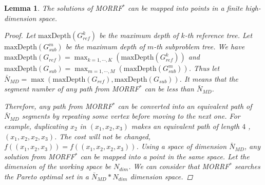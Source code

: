 \documentclass[conference]{IEEEtran}
\newtheorem{lem}{Lemma}
\begin{document}
\begin{lem}
\label{lem:moo-d:rrt}
The solutions of MORRF$^{*}$ can be mapped into points in a finite high-dimension space.
\begin{proof}
Let $ \mbox{maxDepth}(G_{ref}^{k}) $ be the maximum depth of $ k $-th reference tree.
Let $ \mbox{maxDepth}(G_{sub}^{m}) $ be the maximum depth of $ m $-th subproblem tree.
We have $ \mbox{maxDepth}(G_{ref}) = \max_{k = 1 , \cdots , K} ( \mbox{maxDepth}(G_{ref}^{k}) ) $ and $ \mbox{maxDepth}(G_{sub}) = \max_{m = 1 , \cdots , M} ( \mbox{maxDepth}(G_{sub}^{m}) ) $.
Thus let 
 $ \bar{N}_{MD} = \max \left(  \mbox{maxDepth}(G_{ref}), \mbox{maxDepth}(G_{sub}) \right) $.
It means that the segment number of any path from MORRF$^{*}$ can be less than $ \bar{N}_{MD} $.

Therefore, any path from MORRF$^{*}$ can be converted into an equivalent path of $ \bar{N}_{MD} $ segments by repeating some vertex before moving to the next one.
For example, duplicating $ x_{2} $ in $ (x_{1} , x_{2}, x_{3} ) $ makes an equivalent path of length $ 4 $ , $ (x_{1} , x_{2},  x_{2}, x_{3} ) $.
The cost will not be changed, $ f( (x_{1} , x_{2}, x_{3}) ) = f( (x_{1} , x_{2},  x_{2}, x_{3} ) )$.
Using a space of dimension $ \bar{N}_{MD} $, any solution from MORFF$^{*}$ can be mapped into a point in the same space.
Let the dimension of the working space be $ N_{dim} $.
We can consider that MORRF$^{*}$ searches the Pareto optimal set in a $ \bar{N}_{MD} * N_{dim} $ dimension space.
\end{proof}
\end{lem}

\end{document}
